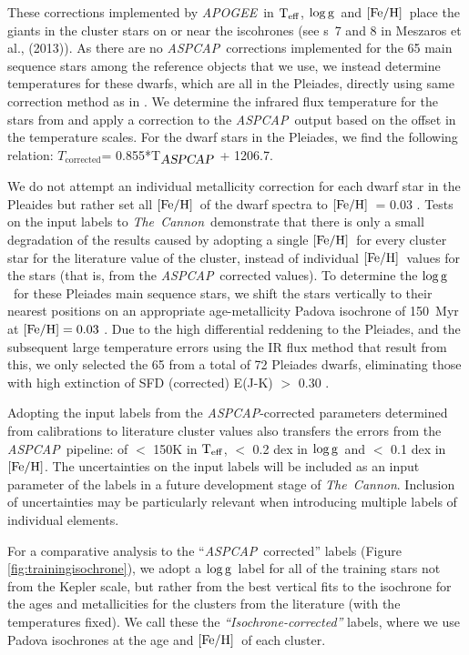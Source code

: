 \documentclass[12pt, preprint]{aastex}
\newcommand{\figurenames}{\figurename s}
\newcommand{\tc}{\textsl{The~Cannon}}
\newcommand{\apogee}{\textsl{APOGEE}}
\newcommand{\aspcap}{\textsl{ASPCAP}}
\newcommand{\teff}{\mbox{$\rm T_{eff}$}}
\newcommand{\feh}{\mbox{$\rm [Fe/H]$}}
\newcommand{\logg}{\mbox{$\rm \log g$}}
\begin{document}
These corrections implemented by \apogee\ in \teff, \logg\ and  \feh\ place the giants in the cluster stars on or near the iscohrones (see \figurenames~7 and 8 in Meszaros et al., (2013)).  
As there are no \aspcap\ corrections implemented for the 65 main sequence stars among the reference objects that we use, 
we instead determine temperatures for these dwarfs, which are all in the Pleiades, directly using same correction method 
as in \citet{Meszaros2013}. 
We determine the infrared flux temperature for the stars from \citet{gonzalez2009} and apply a correction to 
the \aspcap\ output based on the offset in the temperature scales. For the dwarf stars in the Pleiades, we find the following relation:
 $T_{\mbox{corrected}}$= 0.855*T$_{\mbox{\textit{\aspcap}}}$ + 1206.7.

We do not attempt an individual metallicity correction for each dwarf star in the Pleaides but rather set all \feh\ of the dwarf spectra to \feh\ = 0.03 \citep{barrado2001}.
Tests on the input labels to \tc\ demonstrate that there is only a small degradation of the results caused by adopting a single \feh\ for every cluster star for the literature value of the cluster, instead of individual \feh\ values for the stars (that is, from the \aspcap\ corrected values). 
To determine the \logg\ for these Pleiades main sequence stars, we shift the stars vertically to their nearest positions on an appropriate age-metallicity Padova isochrone of 150~Myr at $\feh = 0.03$ \citep{girardi2000}. 
Due to the high differential reddening to the Pleiades, and the subsequent large temperature errors using the IR flux method that result from this, we only selected the 65 from a total of 72 Pleiades dwarfs, eliminating those with high extinction of SFD (corrected) E(J-K) $>$ 0.30 \citep{Schlafly2011}.

Adopting the input labels from the \aspcap-corrected parameters determined from calibrations to literature cluster values also transfers the errors from the \aspcap\ pipeline: of $<$ 150K in \teff,  $<$ 0.2 dex in \logg\ and $<$ 0.1 dex in \feh.   
The uncertainties on the input labels will be included as an input parameter of the labels in a future development stage of \tc. Inclusion of uncertainties may be particularly relevant when introducing multiple labels of individual elements. 

For a comparative analysis to the ``\aspcap\ corrected'' labels (Figure \ref{fig:trainingisochrone}), we adopt a \logg\ label for all of the training stars not from the Kepler scale, but rather from the best vertical fits to the isochrone for the ages and metallicities for the clusters from the literature (with the temperatures fixed).
We call these the \textit{``Isochrone-corrected''} labels, where we use Padova isochrones at the age and \feh\ of each cluster. 
\end{document}
